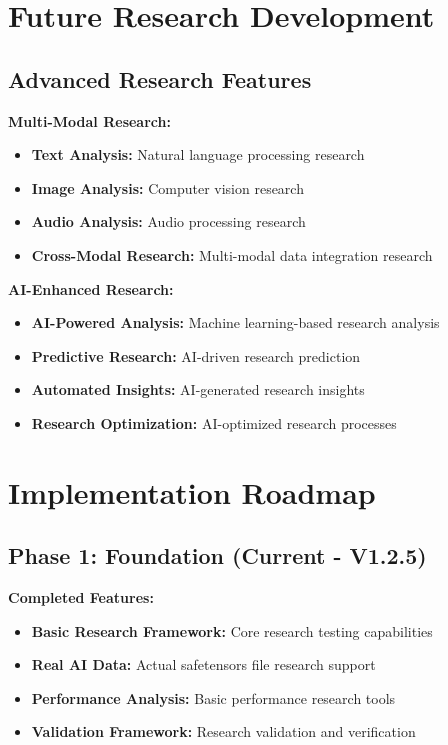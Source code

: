 \documentclass[12pt,a4paper]{article}
\begin{document}
\section{Future Research Development}

\subsection{Advanced Research Features}

\textbf{Multi-Modal Research:}
\begin{itemize}
    \item \textbf{Text Analysis:} Natural language processing research
    \item \textbf{Image Analysis:} Computer vision research
    \item \textbf{Audio Analysis:} Audio processing research
    \item \textbf{Cross-Modal Research:} Multi-modal data integration research
\end{itemize}

\textbf{AI-Enhanced Research:}
\begin{itemize}
    \item \textbf{AI-Powered Analysis:} Machine learning-based research analysis
    \item \textbf{Predictive Research:} AI-driven research prediction
    \item \textbf{Automated Insights:} AI-generated research insights
    \item \textbf{Research Optimization:} AI-optimized research processes
\end{itemize}

\section{Implementation Roadmap}

\subsection{Phase 1: Foundation (Current - V1.2.5)}

\textbf{Completed Features:}
\begin{itemize}
    \item \textbf{Basic Research Framework:} Core research testing capabilities
    \item \textbf{Real AI Data:} Actual safetensors file research support
    \item \textbf{Performance Analysis:} Basic performance research tools
    \item \textbf{Validation Framework:} Research validation and verification
\end{itemize}
\end{document}
